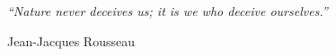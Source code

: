 
\pagestyle{empty}  %

\null\vfill
\textit{``Nature never deceives us; it is we who deceive ourselves.''}

\begin{flushright}
Jean-Jacques Rousseau
\end{flushright}

\vfill\vfill\vfill\vfill\vfill\vfill\null
\clearpage  %
